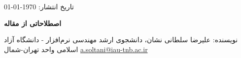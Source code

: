 \documentclass[10pt, a4paper]{article}
\begin{document}
تاریخ انتشار: \today

\textbf{اصطلاحاتی از مقاله }

نویسنده: علیرضا سلطانی نشان، دانشجوی ارشد مهندسی نرم‌افزار - دانشگاه آزاد اسلامی
واحد تهران-شمال \href{mailto:a.soltani@iau-tnb.ac.ir}{a.soltani@iau-tnb.ac.ir}
\end{document}
